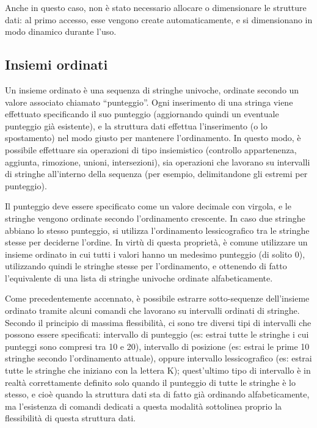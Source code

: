 Anche in questo caso, non è stato necessario allocare o dimensionare le strutture dati: al primo
accesso, esse vengono create automaticamente, e si dimensionano in modo dinamico durante l'uso.

\subsection{Insiemi ordinati}

Un insieme ordinato è una sequenza di stringhe univoche, ordinate secondo un valore associato
chiamato ``punteggio''. Ogni inserimento di una stringa viene effettuato specificando il suo
punteggio (aggiornando quindi un eventuale punteggio già esistente), e la struttura dati effettua
l'inserimento (o lo spostamento) nel modo giusto per mantenere l'ordinamento. In questo modo, è
possibile effettuare sia operazioni di tipo insiemistico (controllo appartenenza, aggiunta,
rimozione, unioni, intersezioni), sia operazioni che lavorano su intervalli di stringhe all'interno
della sequenza (per esempio, delimitandone gli estremi per punteggio).

Il punteggio deve essere specificato come un valore decimale con virgola, e le stringhe vengono
ordinate secondo l'ordinamento crescente. In caso due stringhe abbiano lo stesso punteggio, si
utilizza l'ordinamento lessicografico tra le stringhe stesse per deciderne l'ordine. In virtù di
questa proprietà, è comune utilizzare un insieme ordinato in cui tutti i valori hanno un medesimo
punteggio (di solito 0), utilizzando quindi le stringhe stesse per l'ordinamento, e ottenendo di
fatto l'equivalente di una lista di stringhe univoche ordinate alfabeticamente.

Come precedentemente accennato, è possibile estrarre sotto-sequenze dell'insieme ordinato tramite
alcuni comandi che lavorano su intervalli ordinati di stringhe. Secondo il principio di massima
flessibilità, ci sono tre diversi tipi di intervalli che possono essere specificati: intervallo di
punteggio (es: estrai tutte le stringhe i cui punteggi sono compresi tra 10 e 20), intervallo di
posizione (es: estrai le prime 10 stringhe secondo l'ordinamento attuale), oppure intervallo
lessicografico (es: estrai tutte le stringhe che iniziano con la lettera K); quest'ultimo tipo di
intervallo è in realtà correttamente definito solo quando il punteggio di tutte le stringhe è lo
stesso, e cioè quando la struttura dati sta di fatto già ordinando alfabeticamente, ma l'esistenza
di comandi dedicati a questa modalità sottolinea proprio la flessibilità di questa struttura dati.

